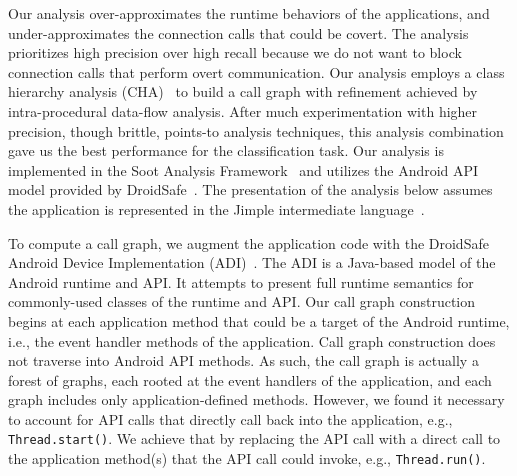 Our analysis over-approximates the runtime behaviors of the
applications, and under-approximates the connection calls that could
be covert.  The analysis prioritizes high precision over high recall
because we do not want to block connection calls that perform overt
communication. Our analysis employs a class hierarchy analysis
(CHA)~\cite{Dean1995} to build a call graph with refinement achieved
by intra-procedural data-flow analysis.  After much
experimentation with higher precision, though brittle, points-to
analysis techniques, this analysis combination gave us the best
performance for the classification task.  Our analysis is implemented
in the Soot Analysis Framework~\cite{Vallee-Rai2000} and utilizes the
Android API model provided by
DroidSafe~\cite{Gordon:Kim:Perkins:Gilham:Nguyen:Rinard:NDSS15}. The
presentation of the analysis below assumes the application is
represented in the Jimple intermediate language~\cite{Vallee-Rai2000}.

To compute a call graph, we augment the application code with the
DroidSafe Android Device Implementation
(ADI)~\cite{Gordon:Kim:Perkins:Gilham:Nguyen:Rinard:NDSS15}.  The ADI
is a Java-based model of the Android runtime and API. It attempts to
present full runtime semantics for commonly-used classes of the
runtime and API.  Our call graph construction begins at each
application method that could be a target of the Android runtime, i.e., 
the event handler methods of the application.  Call graph
construction does not traverse into Android API methods. 
As such, the call
graph is actually a forest of graphs, each rooted at the event
handlers of the application, and each graph includes only
application-defined methods.  However, we found it necessary to
account for API calls that directly call back into the application,
e.g., \lstinline!Thread.start()!. We achieve that by replacing the API call with a
direct call to the application method(s) that the API call could
invoke, e.g., \lstinline!Thread.run()!.




